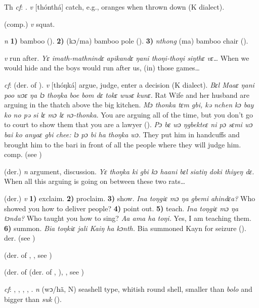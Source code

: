 \begin{letter}{Th}
 \textit{cf}: . \textit{v} [thónthá] catch, e.g., oranges when thrown down (K dialect).

 (comp.) \textit{v} squat.

 \textit{n} \textbf{1)} bamboo (\citealt{Sumner1921}). \textbf{2)} (kɔ/ma) bamboo pole (\citealt{Pichl1967}). \textbf{3)} \textit{nthong} (ma) bamboo chair (\citealt{Pichl1967}).

 \textit{v} run after. \textit{Yɛ imath-mathnindɛ apikandɛ ŋani thoŋi-thoŋi siŋthɛ vɛ…} When we would hide and the boys would run after us, (in) those games…

 \textit{cf}:  (der. of ). \textit{v} [thóŋká] argue, judge, enter a decision (K dialect). \textit{Bɛl Maaɛ ŋani poo wɔɛ ŋa lɔ thoŋka boe bom dɛ tokɛ wusɛ kunɛ.} Rat Wife and her husband are arguing in the thatch above the big kitchen. \textit{Mɔ thonka tɛm gbi, kə nchen kɔ bay ko no pə si lɛ mɔ lɛ nɔ-thonka}. You are arguing all of the time, but you don't go to court to show them that you are a lawyer (\citealt{Pichl1967}). \textit{Pɔ bɛ wɔ ŋgbekteɛ ni pɔ sɛmi wɔ bai ko anyaɛ gbi chee: lɔ pɔ bi ha thoŋka wɔ}. They put him in handcuffs and brought him to the bari in front of all the people where they will judge him. comp.  (see ) 

 (der.) \textit{n} argument, discussion. \textit{Yɛ thoŋka ki gbi kɔ haani bɛl siatiŋ doki thiyeŋ dɛ.} When all this arguing is going on between these two rats…

 (der.) \textit{v} \textbf{1)} exclaim. \textbf{2)} proclaim. \textbf{3)} show. \textit{Ina toŋgiɛ mɔ ŋa gbemi ahindɛa?} Who showed you how to deliver people? \textbf{4)} point out. \textbf{5)} teach. \textit{Ina toŋgiɛ mɔ ŋa tɔnda?} Who taught you how to sing? \textit{Aa ama ha toŋi.} Yes, I am teaching them. \textbf{6)} summon. \textit{Bia toŋkiɛ jali Kaiŋ ha kɔnth.} Bia summoned Kayn for seizure (\citealt{Pichl1967}). der.  (see )

 (der. of , , see ) 

 (der. of  (der. of , ), , see ) 

 \textit{cf}: , , , , . \textit{n} (wɔ/hã, N) seashell type, whitish round shell, smaller than \textit{bolo} and bigger than \textit{suk} (\citealt{Pichl1967}). 


\end{letter}
